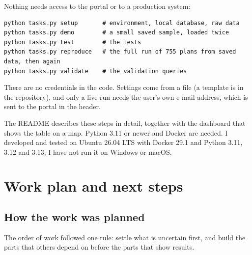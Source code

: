 \documentclass[11pt,a4paper]{article}
\newcommand{\code}[1]{{\small\codeurl{#1}}}
\begin{document}
Nothing needs access to the portal or to a production system:

\begin{lstlisting}
python tasks.py setup       # environment, local database, raw data
python tasks.py demo        # a small saved sample, loaded twice
python tasks.py test        # the tests
python tasks.py reproduce   # the full run of 755 plans from saved data, then again
python tasks.py validate    # the validation queries
\end{lstlisting}

There are no credentials in the code. Settings come from a \code{.env} file (a template is in the repository), and only a
live run needs the user's own e-mail address, which is sent to the portal in the \code{User-Agent} header.

The README describes these steps in detail, together with the dashboard that shows the table on a map. Python 3.11 or
newer and Docker are needed. I developed and tested on Ubuntu 26.04 LTS with Docker 29.1 and Python 3.11, 3.12 and 3.13; I have not run it on
Windows or macOS.

\section{Work plan and next steps}\label{sec:plan}

\subsection{How the work was planned}

The order of work followed one rule: settle what is uncertain first, and build the parts that others depend on before the
parts that show results.
\end{document}

